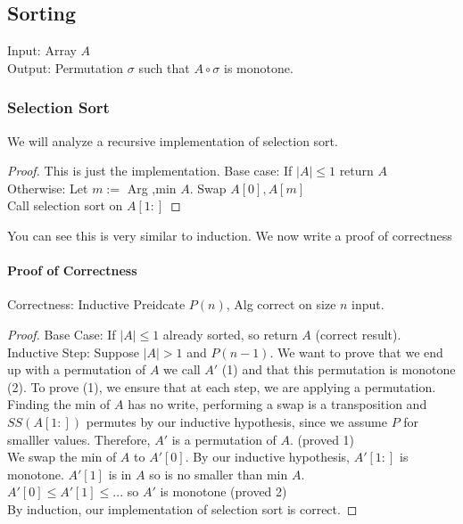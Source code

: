 \documentclass[11pt]{article}
\begin{document}
\subsection{Sorting}
Input: Array $A$ \\
Output: Permutation $\sigma$ such that $A \circ \sigma$ is monotone.

\subsubsection{Selection Sort}
We will analyze a recursive implementation of selection sort.
\begin{proof}
    This is just the implementation.
    Base case: If $|A| \leq 1$ return $A$ \\
    Otherwise: Let $m :=$ Arg ,min $A$. Swap $A[0],A[m]$ \\
    Call selection sort on $A[1:]$
\end{proof}
You can see this is very similar to induction. We now write a proof of correctness
\paragraph{Proof of Correctness}
Correctness: Inductive Preidcate $P(n)$, Alg correct on size $n$ input.
\begin{proof}
    Base Case: If $|A| \leq 1$ already sorted, so return $A$ (correct result). \\
    Inductive Step: Suppose $|A| > 1$ and $P(n-1)$. We want to prove that we end up with a permutation of $A$ we call $A'$ (1) and that this permutation is monotone (2). To prove (1), we ensure that at each step, we are applying a permutation. Finding the min of $A$ has no write, performing a swap is a transposition and $SS(A[1:])$ permutes by our inductive hypothesis, since we assume $P$ for smalller values. Therefore, $A'$ is a permutation of $A$. (proved 1) \\
    We swap the min of $A$ to $A'[0]$. By our inductive hypothesis, $A'[1:]$ is monotone. $A'[1]$ is in $A$ so is no smaller than min $A$. \\
    $A'[0] \leq A'[1] \leq ...$ so $A'$ is monotone (proved 2) \\
    By induction, our implementation of selection sort is correct.
\end{proof}
\end{document}
